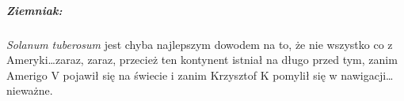 \documentclass[./KNIGA.tex]{subfiles}
\begin{document}
\subparagraph{Ziemniak:} \emph{Solanum tuberosum} jest chyba najlepszym dowodem na to, że nie wszystko co z Ameryki\ldots zaraz, zaraz, przecież ten kontynent istniał na długo przed tym, zanim Amerigo V pojawił się na świecie i zanim Krzysztof K pomylił się w nawigacji\ldots nieważne.
\end{document}
